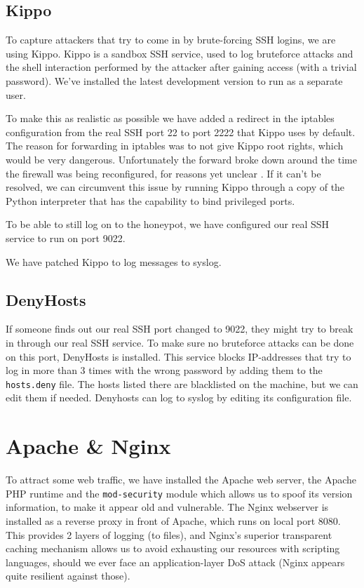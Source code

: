 \documentclass[11pt]{article}
\begin{document}
\subsection{Kippo}
To capture attackers that try to come in by brute-forcing SSH logins, we are using Kippo. 
Kippo is a sandbox SSH service, used to log bruteforce attacks and the shell interaction performed by the attacker after gaining access (with a trivial password). 
We've installed the latest development version to run as a separate user.

To make this as realistic as possible we have added a redirect in the iptables configuration from the real SSH port 22 to port 2222 that Kippo uses by default.
The reason for forwarding in iptables was to not give Kippo root rights, which would be very dangerous.
Unfortunately the forward broke down around the time the firewall was being reconfigured, for reasons yet unclear . 
If it can't be resolved, we can circumvent this issue by running Kippo through a copy of the Python interpreter that has the capability to bind privileged ports.

To be able to still log on to the honeypot, we have configured our real SSH service to run on port 9022.

We have patched Kippo to log messages to syslog.

\subsection{DenyHosts}
If someone finds out our real SSH port changed to 9022, they might try to break in through our real SSH service.
To make sure no bruteforce attacks can be done on this port, DenyHosts is installed.
This service blocks IP-addresses that try to log in more than 3 times with the wrong password by adding them to the \verb|hosts.deny| file.
The hosts listed there are blacklisted on the machine, but we can edit them if needed.
Denyhosts can log to syslog by editing its configuration file.

\section{Apache \& Nginx}
To attract some web traffic, we have installed the Apache web server, the Apache PHP runtime and the \verb|mod-security| module which allows us to spoof its version information, to make it appear old and vulnerable.
The Nginx webserver is installed as a reverse proxy in front of Apache, which runs on local port 8080.
This provides 2 layers of logging (to files), and Nginx's superior transparent caching mechanism allows us to avoid exhausting our resources with scripting languages, should we ever face an application-layer DoS attack (Nginx appears quite resilient against those).
\end{document}
